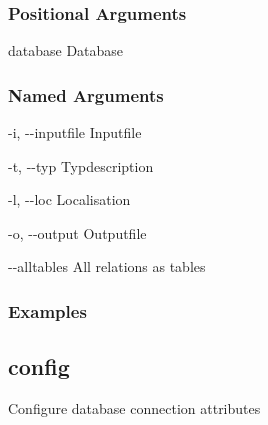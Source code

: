 \documentclass[letterpaper,10pt,english,openany,oneside]{sphinxmanual}
\begin{document}
\subsubsection{Positional Arguments}
\label{\detokenize{cmd_main:Positional Arguments_repeat2}}\begin{optionlist}{3cm}
\item [database]  
Database
\end{optionlist}


\subsubsection{Named Arguments}
\label{\detokenize{cmd_main:Named Arguments_repeat9}}\begin{optionlist}{3cm}
\item [-i, -{-}inputfile]  
Inputfile
\item [-t, -{-}typ]  
Typdescription
\item [-l, -{-}loc]  
Localisation
\item [-o, -{-}output]  
Outputfile
\item [-{-}alltables]  
All relations as tables
\end{optionlist}

\subsubsection{Examples}
\begin{sphinxVerbatim}[commandchars=\\\{\}]
    
\end{sphinxVerbatim}

\subsection{config}
\label{\detokenize{cmd_main:config}}
Configure database connection attributes

\begin{sphinxVerbatim}[commandchars=\\\{\}]
  \PYG{p}{[}\PYG{p}{]} \PYG{p}{[}\PYG{p}{]}
              
\end{sphinxVerbatim}
\end{document}
